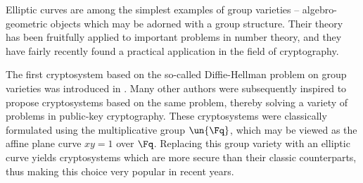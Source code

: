 



Elliptic curves are among the simplest examples of group varieties -- algebro-geometric objects which may be adorned with a group structure. Their theory has been fruitfully applied to important problems in number theory, and they have fairly recently found a practical application in the field of cryptography.

The first cryptosystem based on the so-called Diffie-Hellman problem on group varieties was introduced in \citep{DiffieHellman}. Many other authors were subsequently inspired to propose cryptosystems based on the same problem, thereby solving a variety of problems in public-key cryptography. These cryptosystems were classically formulated using the multiplicative group $\un{\Fq}$, which may be viewed as the affine plane curve $xy = 1$ over $\Fq$. Replacing this group variety with an elliptic curve yields cryptosystems which are more secure than their classic counterparts, thus making this choice very popular in recent years.

